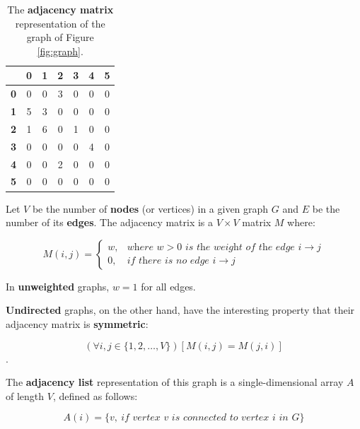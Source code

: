 \documentclass[letterpaper,12pt]{article}
\begin{document}
\begin{table}[H]
	\centering
		\renewcommand*{\arraystretch}{1.5}
	\begin{tabular}{|c|c|c|c|c|c|c|} \hline
			&   \textbf{0} & \textbf{1} & \textbf{2} & \textbf{3} & \textbf{4} & \textbf{5} \\ \hline
		\textbf{0} & 0  & 0 & 3 & 0 & 0  & 0 \\ \hline
		\textbf{1} & 5  & 3 & 0 & 0 & 0 & 0 \\ \hline
		\textbf{2} & 1  & 6 & 0 & 1 & 0 & 0 \\ \hline
		\textbf{3} & 0  & 0 & 0 & 0 & 4 & 0 \\ \hline
		\textbf{4} & 0 & 0 & 2 & 0 & 0 & 0 \\ \hline 
		\textbf{5} & 0 & 0 & 0 & 0 & 0 & 0 \\ \hline 
	\end{tabular} 
	\caption{The {\bf adjacency matrix} representation of the graph of Figure \ref{fig:graph}.}
	\label{tbl:adjMat}
\end{table}

Let $V$ be the number of {\bf nodes} (or vertices) in a given graph $G$ and $E$ be the number of its \textbf{edges}. The adjacency matrix is a $V \times V$ matrix $M$ where: 

$$M(i, j) = \begin{cases} w, & \textit{where } w > 0 \textit{ is the weight of the edge } i \rightarrow j \\ 0,  & \textit{if there is no edge } i \rightarrow j \end{cases}$$

In \textbf{unweighted} graphs, $w = 1$ for all edges. 

{\bf Undirected} graphs, on the other hand, have the interesting property that their adjacency matrix is   {\bf symmetric}: 

$$(\forall i , j \in \{ 1, 2, \dots , V \})[M(i, j ) = M(j, i)]$$. 

The {\bf adjacency list} representation of this graph is a single-dimensional array $A$ of length $V$, defined as follows:

$$A(i) = \{ v,\ \textit{if vertex } v \textit{ is connected to vertex  } i \textit{ in } G \}$$
\end{document}
